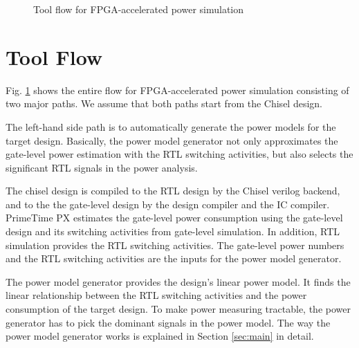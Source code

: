 \begin{figure}
  \centering
  \caption{Tool flow for FPGA-accelerated power simulation}
  \label{fig:toolflow}
\end{figure}

\section {Tool Flow}
Fig. \ref{fig:toolflow} shows the entire flow for FPGA-accelerated power simulation consisting of two major paths.
We assume that both paths start from the Chisel design.

The left-hand side path is to automatically generate the power models for the target design.
Basically, the power model generator not only approximates the gate-level power estimation with the RTL switching activities,
but also selects the significant RTL signals in the power analysis.

The chisel design is compiled to the RTL design by the Chisel verilog backend,
and to the the gate-level design by the design compiler and the IC compiler.
PrimeTime PX estimates the gate-level power consumption using the gate-level design and its switching activities from gate-level simulation.
In addition, RTL simulation provides the RTL switching activities.
The gate-level power numbers and the RTL switching activities are the inputs for the power model generator.

The power model generator provides the design's linear power model.
It finds the linear relationship between the RTL switching activities and the power consumption of the target design.
To make power measuring tractable, the power generator has to pick the dominant signals in the power model.
The way the power model generator works is explained in Section \ref{sec:main} in detail.

